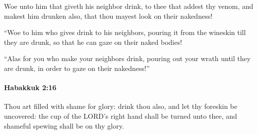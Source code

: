 			\begin{versebox}
					\item[BHS] 
					\item[LXX] 
					\item[ASV] Woe unto him that giveth his neighbor drink, to thee that addest thy venom, and makest him drunken also, that thou mayest look on their nakedness!
					\item[NIV] “Woe to him who gives drink to his neighbors, pouring it from the wineskin till they are drunk, so that he can gaze on their naked bodies!
					\item[NRSV] “Alas for you who make your neighbors drink, pouring out your wrath until they are drunk, in order to gaze on their nakedness!”
			\end{versebox}

		\paragraph{Habakkuk 2:16} %
			\label{HABAKKUK-2-16}

			Thou art filled with shame for glory: drink thou also, and let thy foreskin be uncovered: the cup of the LORD’s right hand shall be turned unto thee, and shameful spewing shall be on thy glory.

